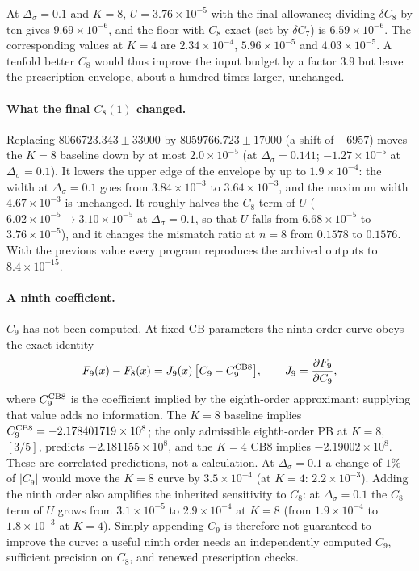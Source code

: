 \documentclass[11pt,a4paper]{article}
\numberwithin{equation}{section}
\newcommand{\Ds}{\Delta_\sigma}
\newcommand{\sci}[2]{#1\times10^{#2}}
\begin{document}
At $\Ds=0.1$ and $K=8$, $U=\sci{3.76}{-5}$ with the final allowance; dividing $\delta C_8$ by ten
gives $\sci{9.69}{-6}$, and the floor with $C_8$ exact (set by $\delta C_7$) is $\sci{6.59}{-6}$.
The corresponding values at $K=4$ are $\sci{2.34}{-4}$, $\sci{5.96}{-5}$ and $\sci{4.03}{-5}$. A
tenfold better $C_8$ would thus improve the input budget by a factor $3.9$ but leave the
prescription envelope, about a hundred times larger, unchanged.

\paragraph{What the final $C_8(1)$ changed.} Replacing $8066723.343\pm33000$ by
$8059766.723\pm17000$ (a shift of $-6957$) moves the $K=8$ baseline down by at most
$\sci{2.0}{-5}$ (at $\Ds=0.141$; $\sci{-1.27}{-5}$ at $\Ds=0.1$). It lowers the upper edge of
the envelope by up to $\sci{1.9}{-4}$: the width at $\Ds=0.1$ goes from $\sci{3.84}{-3}$ to
$\sci{3.64}{-3}$, and the maximum width $\sci{4.67}{-3}$ is unchanged. It roughly halves the
$C_8$ term of $U$ ($\sci{6.02}{-5}\to\sci{3.10}{-5}$ at $\Ds=0.1$, so that $U$ falls from
$\sci{6.68}{-5}$ to $\sci{3.76}{-5}$), and it changes the mismatch ratio at $n=8$ from $0.1578$
to $0.1576$. With the previous value every program reproduces the archived outputs to
$\sci{8.4}{-15}$.

\paragraph{A ninth coefficient.} $C_9$ has not been computed. At fixed CB parameters the
ninth-order curve obeys the exact identity
\begin{equation}
 F_9(x)-F_8(x)=J_9(x)\,\bigl[C_9-C_9^{\rm CB8}\bigr],\qquad J_9=\frac{\partial F_9}{\partial C_9},
 \label{eq:C9}
\end{equation}
where $C_9^{\rm CB8}$ is the coefficient implied by the eighth-order approximant; supplying
that value adds no information. The $K=8$ baseline implies
$C_9^{\rm CB8}=\sci{-2.178401719}{8}$; the only admissible eighth-order PB at $K=8$, $[3/5]$,
predicts $\sci{-2.181155}{8}$, and the $K=4$ CB8 implies $\sci{-2.19002}{8}$. These are correlated
predictions, not a calculation. At $\Ds=0.1$ a change of $1\%$ of $|C_9|$ would move the
$K=8$ curve by $\sci{3.5}{-4}$ (at $K=4$: $\sci{2.2}{-3}$). Adding the ninth order also amplifies
the inherited sensitivity to $C_8$: at $\Ds=0.1$ the $C_8$ term of $U$ grows from $\sci{3.1}{-5}$
to $\sci{2.9}{-4}$ at $K=8$ (from $\sci{1.9}{-4}$ to $\sci{1.8}{-3}$ at $K=4$). Simply appending
$C_9$ is therefore not guaranteed to improve the curve: a useful ninth order needs an
independently computed $C_9$, sufficient precision on $C_8$, and renewed prescription checks.
\end{document}
